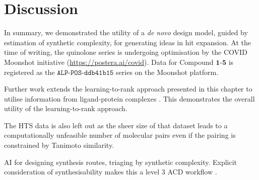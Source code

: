 \section{Discussion} \label{sec:discussion}

In summary, we demonstrated the utility of a \emph{de novo} design model, guided by estimation of synthetic complexity, for generating ideas in hit expansion. At the time of writing, the quinolone series is undergoing optimisation by the COVID Moonshot initiative (\url{https://postera.ai/covid}). Data for Compound $\mathbf{1}$-$\mathbf{5}$ is registered as the $\texttt{ALP-POS-ddb41b15}$ series on the Moonshot platform. 

Further work extends the learning-to-rank approach presented in this chapter to utilise information from ligand-protein complexes \cite{Saar2023pnas}. This demonstrates the overall utility of the learning-to-rank approach.

The HTS data is also left out as the sheer size of that dataset leads to a computationally unfeasible number of molecular pairs even if the pairing is constrained by Tanimoto similarity.

AI for designing synthesis routes, triaging by synthetic complexity. Explicit consideration of synthesisability makes this a level 3 ACD workflow \cite{Goldman2022ChemicalDesignLevels}.




